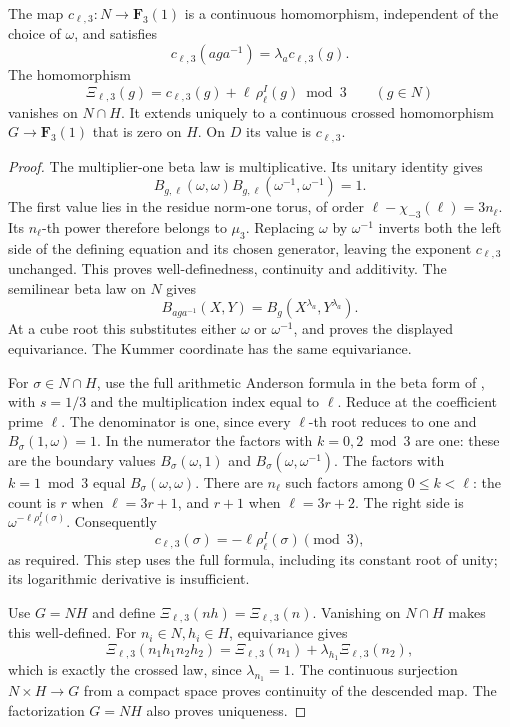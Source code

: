 \begin{proposition}\label{prop:cubic-finite-relative-cocycle}
The map \(c_{\ell,3}:N\to\mathbf F_3(1)\) is a continuous
homomorphism, independent of the choice of \(\omega\), and satisfies
\[
 c_{\ell,3}(aga^{-1})=\lambda_a c_{\ell,3}(g).
\]
The homomorphism
\[
 \Xi_{\ell,3}(g)=c_{\ell,3}(g)+
                  \ell\,\rho_\ell^I(g)\bmod3
                       \qquad(g\in N)
\]
vanishes on \(N\cap H\). It extends uniquely to a continuous
crossed homomorphism \(G\to\mathbf F_3(1)\) that is zero on \(H\).
On \(D\) its value is \(c_{\ell,3}\).
\end{proposition}
\begin{proof}
The multiplier-one beta law is multiplicative. Its unitary identity
gives
\[
 B_{g,\ell}(\omega,\omega)
 B_{g,\ell}(\omega^{-1},\omega^{-1})=1.
\]
The first value lies in the residue norm-one torus, of order
\(\ell-\chi_{-3}(\ell)=3n_\ell\). Its \(n_\ell\)-th power
therefore belongs to \(\mu_3\). Replacing \(\omega\) by
\(\omega^{-1}\) inverts both the left side of the defining equation
and its chosen generator, leaving the exponent \(c_{\ell,3}\)
unchanged. This proves well-definedness, continuity and additivity.
The semilinear beta law on \(N\) gives
\[
 B_{aga^{-1}}(X,Y)
       =B_g(X^{\lambda_a},Y^{\lambda_a}).
\]
At a cube root this substitutes either \(\omega\) or
\(\omega^{-1}\), and proves the displayed equivariance.
The Kummer coordinate has the same equivariance.

For \(\sigma\in N\cap H\), use the full arithmetic Anderson
formula in the beta form of
\cite[Remark~2.4, p.~101]{Furusho2003}, with \(s=1/3\) and
the multiplication index equal to \(\ell\). Reduce at the
coefficient prime \(\ell\). The denominator is one, since every
\(\ell\)-th root reduces to one and \(B_\sigma(1,\omega)=1\).
In the numerator the factors with \(k=0,2\bmod3\) are one:
these are the boundary values
\(B_\sigma(\omega,1)\) and \(B_\sigma(\omega,\omega^{-1})\).
The factors with \(k=1\bmod3\) equal
\(B_\sigma(\omega,\omega)\). There are \(n_\ell\) such factors
among \(0\le k<\ell\): the count is \(r\) when
\(\ell=3r+1\), and \(r+1\) when \(\ell=3r+2\).
The right side is \(\omega^{-\ell\rho_\ell^I(\sigma)}\).
Consequently
\[
 c_{\ell,3}(\sigma)=-\ell\rho_\ell^I(\sigma)\pmod3,
\]
as required. This step uses the full formula, including its
constant root of unity; its logarithmic derivative is insufficient.

Use \(G=NH\) and define
\(\Xi_{\ell,3}(nh)=\Xi_{\ell,3}(n)\).
Vanishing on \(N\cap H\) makes this well-defined.
For \(n_i\in N,h_i\in H\), equivariance gives
\[
 \Xi_{\ell,3}(n_1h_1n_2h_2)
   =\Xi_{\ell,3}(n_1)+\lambda_{h_1}\Xi_{\ell,3}(n_2),
\]
which is exactly the crossed law, since \(\lambda_{n_1}=1\).
The continuous surjection \(N\times H\to G\) from a compact
space proves continuity of the descended map. The factorization
\(G=NH\) also proves uniqueness.
\end{proof}

